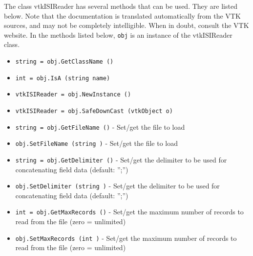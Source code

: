 The class vtkISIReader has several methods that can be used.
  They are listed below.
Note that the documentation is translated automatically from the VTK sources,
and may not be completely intelligible.  When in doubt, consult the VTK website.
In the methods listed below, \verb|obj| is an instance of the vtkISIReader class.
\begin{itemize}
\item  \verb|string = obj.GetClassName ()|

\item  \verb|int = obj.IsA (string name)|

\item  \verb|vtkISIReader = obj.NewInstance ()|

\item  \verb|vtkISIReader = obj.SafeDownCast (vtkObject o)|

\item  \verb|string = obj.GetFileName ()| -  Set/get the file to load

\item  \verb|obj.SetFileName (string )| -  Set/get the file to load

\item  \verb|string = obj.GetDelimiter ()| -  Set/get the delimiter to be used for concatenating field data (default: '';'')

\item  \verb|obj.SetDelimiter (string )| -  Set/get the delimiter to be used for concatenating field data (default: '';'')

\item  \verb|int = obj.GetMaxRecords ()| -  Set/get the maximum number of records to read from the file (zero = unlimited)

\item  \verb|obj.SetMaxRecords (int )| -  Set/get the maximum number of records to read from the file (zero = unlimited)

\end{itemize}
